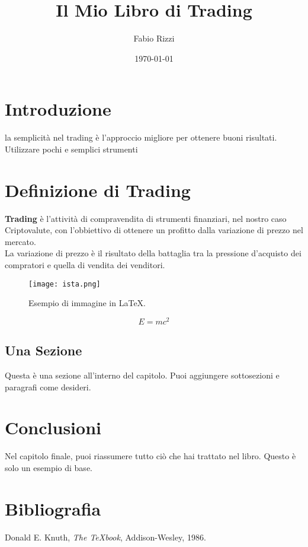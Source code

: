 \documentclass[12pt]{book}
\begin{document}
\title{Il Mio Libro di Trading}
\author{Fabio Rizzi}
\date{\today}
\maketitle  %

\tableofcontents

\chapter*{Introduzione}
la semplicità nel trading è l'approccio migliore per ottenere buoni risultati.\\
Utilizzare pochi e semplici strumenti
\chapter{Definizione di Trading}
\textbf{Trading} è l'attività di compravendita di strumenti finanziari, nel nostro caso Criptovalute, con l'obbiettivo di ottenere un profitto dalla variazione di prezzo nel mercato.\\ La variazione di prezzo è il risultato della battaglia tra la pressione d'acquisto dei compratori e quella di vendita dei venditori.

\begin{figure}[h!]
    \centering
    \texttt{[image: ista.png]}  
    \caption{Esempio di immagine in \LaTeX.}
    \label{fig:esempio}
\end{figure}

\begin{equation}
E = mc^2
\end{equation}

\section{Una Sezione}
Questa è una sezione all'interno del capitolo. Puoi aggiungere sottosezioni e paragrafi come desideri.

\chapter{Conclusioni}
Nel capitolo finale, puoi riassumere tutto ciò che hai trattato nel libro. Questo è solo un esempio di base.

\newpage
\chapter*{Bibliografia}
\begin{thebibliography}{9}
 Donald E. Knuth, \textit{The TeXbook}, Addison-Wesley, 1986.
\end{thebibliography}
\end{document}
